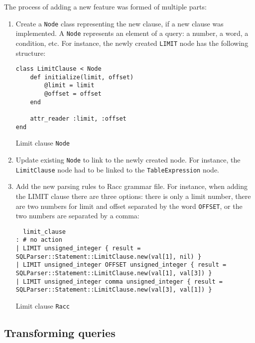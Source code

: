 The process of adding a new feature was formed of multiple parts:
\begin{enumerate}
    \item Create a \texttt{Node} class representing the new clause, if a new clause was implemented. A \texttt{Node} represents an element of a query: a number, a word, a condition, etc. For instance, the newly created \texttt{LIMIT} node has the following structure:
    \begin{listing}[H]
        \centering
\begin{verbatim}
class LimitClause < Node
    def initialize(limit, offset)
        @limit = limit
        @offset = offset
    end

    attr_reader :limit, :offset
end
\end{verbatim}
\caption{Limit clause \texttt{Node}}
\label{fig:limit_clause}
\end{listing}
    \item Update existing \texttt{Node} to link to the newly created node. For instance, the \texttt{LimitClause} node had to be linked to the \texttt{TableExpression} node.
    \item Add the new parsing rules to Racc grammar file. For instance, when adding the LIMIT clause there are three options: there is only a limit number, there are two numbers for limit and offset separated by the word \texttt{OFFSET}, or the two numbers are separated by a comma:
\begin{listing}[H]
    \centering
    \begin{verbatim}
  limit_clause
: # no action
| LIMIT unsigned_integer { result = SQLParser::Statement::LimitClause.new(val[1], nil) }
| LIMIT unsigned_integer OFFSET unsigned_integer { result = SQLParser::Statement::LimitClause.new(val[1], val[3]) }
| LIMIT unsigned_integer comma unsigned_integer { result = SQLParser::Statement::LimitClause.new(val[3], val[1]) }
    \end{verbatim}
    \caption{Limit clause \texttt{Racc}}
    \label{fig:limit_clause_racc}
\end{listing}
\end{enumerate}

\subsection{Transforming queries}

